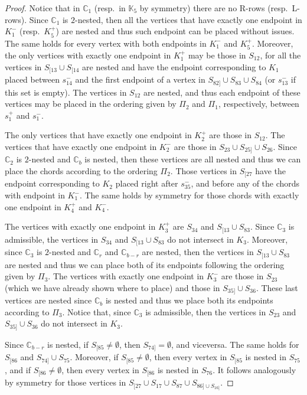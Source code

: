 \documentclass[12pt]{book}
\theoremstyle{plain}
\theoremstyle{remark}
\begin{document}
\begin{proof}
Notice that in $\mathbb C_1$ (resp.\ in $\mathbb K_5$ by symmetry) there are no R-rows (resp.\ L-rows). Since $\mathbb C_1$ is $2$-nested, then all the vertices that have exactly one endpoint in $K_1^{-}$ (resp.\ $K_5^{+}$) are nested and thus such endpoint can be placed without issues. The same holds for every vertex with both endpoints in $K_1^{-}$ and $K_5^{+}$.
	Moreover, the only vertices with exactly one endpoint in $K_1^{+}$ may be those in $S_{12}$, for all the vertices in $S_{[13} \cup S_{[14}$ are nested and have the endpoint corresponding to $K_1$ placed between $s_{14}^{-}$ and the first endpoint of a vertex in $S_{82]} \cup S_{83} \cup S_{84}$ (or $s_{13}^{-}$ if this set is empty). The vertices in $S_{12}$ are nested, and thus each endpoint of these vertices may be placed in the ordering given by $\Pi_2$ and $\Pi_1$, respectively, between $s_1^{+}$ and $s_1^{-}$.

The only vertices that have exactly one endpoint in $K_2^{+}$ are those in $S_{12}$. The vertices that have exactly one endpoint in $K_2^{-}$ are those in $S_{23} \cup S_{25]} \cup S_{26}$. Since $\mathbb C_2$ is $2$-nested and $\mathbb C_b$ is nested, then these vertices are all nested and thus we can place the chords according to the ordering $\Pi_2$. Those vertices in $S_{[27}$ have the endpoint corresponding to $K_2$ placed right after $s_{35}^{-}$, and before any of the chords with endpoint in $K_1^{-}$.
	The same holds by symmetry for those chords with exactly one endpoint in $K_4^{+}$ and $K_4^{-}$.

The vertices with exactly one endpoint in $K_3^{+}$ are $S_{34}$ and $S_{[13} \cup S_{83}$. Since $\mathbb C_3$ is admissible, the vertices in $S_{34}$ and $S_{[13} \cup S_{83}$ do not intersect in $K_3$. Moreover, since $\mathbb C_3$ is $2$-nested and $\mathbb C_r$ and $\mathbb C_{b-r}$ are nested, then the vertices in $S_{[13} \cup S_{83}$ are nested and thus we can place both of its endpoints following the ordering given by $\Pi_3$.
	The vertices with exactly one endpoint in $K_3^{-}$ are those in $S_{23}$ (which we have already shown where to place) and those in $S_{35]} \cup S_{36}$. These last vertices are nested since $\mathbb C_b$ is nested and thus we place both its endpoints according to $\Pi_3$. Notice that, since $\mathbb C_3$ is admissible, then the vertices in $S_{23}$ and $S_{35]}  \cup S_{36}$ do not intersect in $K_3$.
	
	Since $\mathbb C_{b-r}$ is nested, if $S_{[85} \neq \emptyset$, then $S_{74]} = \emptyset$, and viceversa. The same holds for $S_{[86}$ and $S_{74]} \cup S_{75}$. Moreover, if $S_{[85} \neq \emptyset$, then every vertex in $S_{[85}$ is nested in $S_{75}$, and if $S_{[86} \neq \emptyset$, then every vertex in $S_{[86}$ is nested in $S_{76}$. It follows analogously by symmetry for those vertices in $S_{[27} \cup S_{17} \cup S_{87} \cup S_{86] \cup S_{16]}}$.
	

\end{proof}
\end{document}
